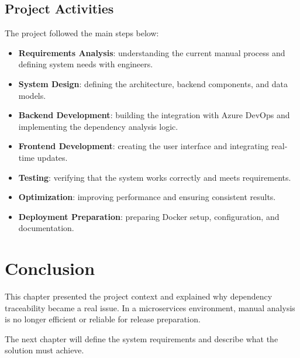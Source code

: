 \subsection{Project Activities}
\label{subsec:activities}

The project followed the main steps below:

\begin{itemize}
  \item \textbf{Requirements Analysis}: understanding the current manual process
  and defining system needs with engineers.

  \item \textbf{System Design}: defining the architecture, backend components,
  and data models.

  \item \textbf{Backend Development}: building the integration with Azure DevOps
  and implementing the dependency analysis logic.

  \item \textbf{Frontend Development}: creating the user interface and
  integrating real-time updates.

  \item \textbf{Testing}: verifying that the system works correctly and meets
  requirements.

  \item \textbf{Optimization}: improving performance and ensuring consistent results.

  \item \textbf{Deployment Preparation}: preparing Docker setup, configuration,
  and documentation.
\end{itemize}

\section{Conclusion}
\label{sec:overview-conclusion}

This chapter presented the project context and explained why dependency
traceability became a real issue. In a microservices environment, manual
analysis is no longer efficient or reliable for release preparation.

The next chapter will define the system requirements and describe what the
solution must achieve.